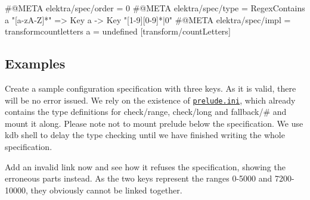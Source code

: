\begin{DoxyCode}
#@META elektra/spec/order = 0
#@META elektra/spec/type = RegexContains a "[a-zA-Z]*" => Key a -> Key "[1-9][0-9]*|0"
#@META elektra/spec/impl = transformcountletters a = undefined
[transform/countLetters]
\end{DoxyCode}


\subsection*{Examples}

Create a sample configuration specification with three keys. As it is valid, there will be no error issued. We rely on the existence of \href{/home/markus/Projekte/Elektra/current/src/plugins/typechecker/typechecker/prelude.ini}{\tt prelude.\+ini}, which already contains the type definitions for {\ttfamily check/range}, {\ttfamily check/long} and {\ttfamily fallback/\#} and mount it along. Please note not to mount prelude below the specification. We use kdb shell to delay the type checking until we have finished writing the whole specification.




Add an invalid link now and see how it refuses the specification, showing the erroneous parts instead. As the two keys represent the ranges 0-\/5000 and 7200-\/10000, they obviously cannot be linked together.



